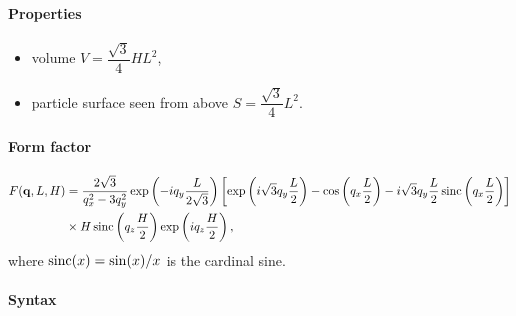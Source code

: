 \paragraph{Properties}
\begin{itemize}
\item volume $V= \dfrac{\sqrt{3}}{4} H L^2$,
\item particle surface seen from above $S =\dfrac{\sqrt{3}}{4}L^2$.

\end{itemize}

\paragraph{Form factor}
\begin{align*}
F(\mathbf{q},L, H) &= \frac{2 \sqrt{3}}{q_x^2-3q_y^2}  \exp\left(-i q_y\frac{L}{2\sqrt{3}}\right)\left[\exp\left(i \sqrt{3} q_y \frac{L}{2} \right)-\cos\left(q_x \frac{L}{2}\right)-i \sqrt{3} q_y \frac{L}{2} \operatorname{sinc}\left(q_x \frac{L}{2}\right) \right] \\
  &
\times  H \operatorname{sinc}\left(q_z \frac{H}{2} \right) \exp\left(i q_z \frac{H}{2}\right),
\end{align*}
where $\operatorname{sinc}(x)=\sin(x)/x$ is the cardinal sine.

\paragraph{Syntax}\strut\\

